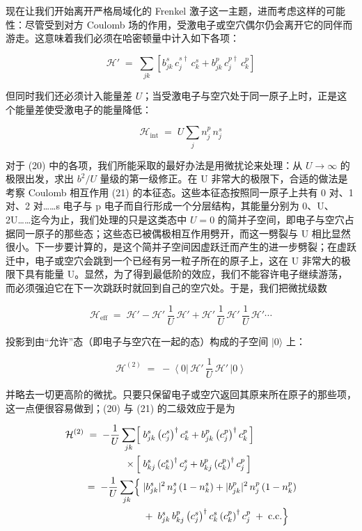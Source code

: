现在让我们开始离开严格局域化的 Frenkel 激子这一主题，进而考虑这样的可能性：尽管受到对方 Coulomb 场的作用，受激电子或空穴偶尔仍会离开它的同伴而游走。这意味着我们必须在哈密顿量中计入如下各项：

\begin{equation*}
\mathcal{H}' \;=\; \sum_{jk}\left[b_{jk}^{s}\,c_j^{s\dagger}\,c_k^{s} + b_{jk}^{p}\,c_j^{p\dagger}\,c_k^{p}\right] \tag{20}
\end{equation*}

但同时我们还必须计入能量差 $U$；当受激电子与空穴处于同一原子上时，正是这个能量差使受激电子的能量降低：

\begin{equation*}
\mathcal{H}_{\mathrm{int}} \;=\; U\sum_j n_j^{p}\,n_j^{s} \tag{21}
\end{equation*}

对于 (20) 中的各项，我们所能采取的最好办法是用微扰论来处理：从 $U\to\infty$ 的极限出发，求出 $b^{2}/U$ 量级的第一级修正。在 U 非常大的极限下，合适的做法是考察 Coulomb 相互作用 (21) 的本征态。这些本征态按照同一原子上共有 0 对、1 对、2 对……s 电子与 p 电子而自行形成一个分层结构，其能量分别为 0、U、2U……迄今为止，我们处理的只是这类态中 $U = 0$ 的简并子空间，即电子与空穴占据同一原子的那些态；这些态已被偶极相互作用劈开，而这一劈裂与 U 相比显然很小。下一步要计算的，是这个简并子空间因虚跃迁而产生的进一步劈裂；在虚跃迁中，电子或空穴会跳到一个已经有另一粒子所在的原子上，这在 U 非常大的极限下具有能量 U。显然，为了得到最低阶的效应，我们不能容许电子继续游荡，而必须强迫它在下一次跳跃时就回到自己的空穴处。于是，我们把微扰级数

\begin{equation*}
\mathcal{H}_{\mathrm{eff}} \;=\; \mathcal{H}' - \mathcal{H}'\,\frac{1}{U}\,\mathcal{H}' + \mathcal{H}'\,\frac{1}{U}\,\mathcal{H}'\,\frac{1}{U}\,\mathcal{H}' \cdots
\end{equation*}

投影到由“允许”态（即电子与空穴在一起的态）构成的子空间 $|0\rangle$ 上：

\begin{equation*}
\mathcal{H}^{(2)} \;=\; -\left\langle 0\right|\,\mathcal{H}'\,\frac{1}{U}\,\mathcal{H}'\,\left|0\right\rangle
\end{equation*}

并略去一切更高阶的微扰。只要只保留电子或空穴返回其原来所在原子的那些项，这一点便很容易做到；(20) 与 (21) 的二级效应于是为

\begin{align*}
\mathcal{H}^{(2)} \;=\; -\frac{1}{U}\sum_{jk}\Bigl[\; & b_{jk}^{s}\left(c_j^{s}\right)^{\dagger}c_k^{s} + b_{jk}^{p}\left(c_j^{p}\right)^{\dagger}c_k^{p}\,\Bigr] \\
\times\,\Bigl[\; & b_{kj}^{s}\left(c_k^{s}\right)^{\dagger}c_j^{s} + b_{kj}^{p}\left(c_k^{p}\right)^{\dagger}c_j^{p}\,\Bigr] \\
=\; -\frac{1}{U}\sum_{jk}\Bigl\{\; & |b_{jk}^{s}|^{2}\,n_j^{s}\left(1 - n_k^{s}\right) + |b_{jk}^{p}|^{2}\,n_j^{p}\left(1 - n_k^{p}\right) \\
& +\; b_{jk}^{s}\,b_{kj}^{p}\left(c_j^{s}\right)^{\dagger}c_k^{s}\left(c_k^{p}\right)^{\dagger}c_j^{p} \;+\; \mathrm{c.c.}\Bigr\}
\end{align*}

